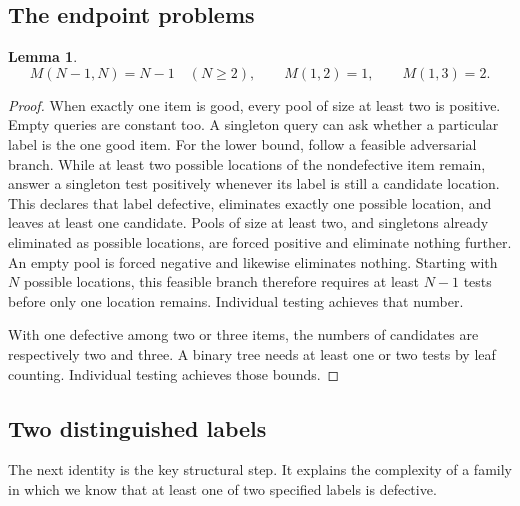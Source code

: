 \documentclass[11pt]{article}
\newtheorem{lemma}[theorem]{Lemma}
\theoremstyle{definition}
\theoremstyle{remark}
\numberwithin{equation}{section}
\begin{document}
\subsection{The endpoint problems}

\begin{lemma}\label{lem:endpoints}
\[
 M(N-1,N)=N-1\quad(N\ge2),\qquad M(1,2)=1,\qquad M(1,3)=2.
\]
\end{lemma}
\begin{proof}
When exactly one item is good, every pool of size at least two is
positive. Empty queries are constant too. A singleton query can
ask whether a particular label is the one good item.
For the lower bound, follow a feasible adversarial branch. While at
least two possible locations of the nondefective item remain,
answer a singleton test positively whenever its label is still a
candidate location. This declares that label defective, eliminates
exactly one possible location, and leaves at least one candidate.
Pools of size at least two, and singletons already eliminated as
possible locations, are forced positive and eliminate nothing further.
An empty pool is forced negative and likewise eliminates nothing.
Starting with \(N\) possible locations, this feasible branch therefore
requires at least \(N-1\) tests before only one location remains.
Individual testing achieves that number.

With one defective among two or three items, the numbers of
candidates are respectively two and three. A binary tree needs at
least one or two tests by leaf counting. Individual testing achieves
those bounds.
\end{proof}

\subsection{Two distinguished labels}

The next identity is the key structural step. It explains the
complexity of a family in which we know that at least one of two
specified labels is defective.
\end{document}
